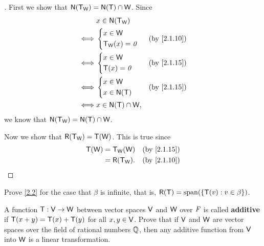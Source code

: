 \begin{proof}[]
  First we show that \(\ns{\T_{\W}} = \ns{\T} \cap \W\).
  Since
  \begin{align*}
         & x \in \ns{\T_{\W}}                                         \\
    \iff & \begin{dcases}
      x \in \W \\
      \T_{\W}(x) = \zv
    \end{dcases} &  & \text{(by \cref{2.1.10})} \\
    \iff & \begin{dcases}
      x \in \W \\
      \T(x) = \zv
    \end{dcases} &  & \text{(by \cref{2.1.15})} \\
    \iff & \begin{dcases}
      x \in \W \\
      x \in \ns{\T}
    \end{dcases} &  & \text{(by \cref{2.1.15})} \\
    \iff & x \in \ns{\T} \cap \W,
  \end{align*}
  we know that \(\ns{\T_{\W}} = \ns{\T} \cap \W\).

  Now we show that \(\rg{\T_{\W}} = \T(\W)\).
  This is true since
  \begin{align*}
    \T(\W) & = \T_{\W}(\W)   &  & \text{(by \cref{2.1.15})} \\
           & = \rg{\T_{\W}}. &  & \text{(by \cref{2.1.10})}
  \end{align*}
\end{proof}

\begin{ex}\label{ex:2.1.33}
  Prove \cref{2.2} for the case that \(\beta\) is infinite, that is, \(\rg{\T} = \spn{\set{\T(v) : v \in \beta}}\).
\end{ex}

\begin{ex}\label{ex:2.1.37}
  A function \(\mathsf{T} : \mathsf{V} \to \mathsf{W}\) between vector spaces \(\mathsf{V}\) and \(\mathsf{W}\) over \(\mathit{F}\) is called \textbf{additive} if \(\mathsf{T}(x + y) = \mathsf{T}(x) + \mathsf{T}(y)\) for all \(x, y \in \mathsf{V}\).
  Prove that if \(\mathsf{V}\) and \(\mathsf{W}\) are vector spaces over the field of rational numbers \(\mathbb{Q}\), then any additive function from \(\mathsf{V}\) into \(\mathsf{W}\) is a linear transformation.
\end{ex}
